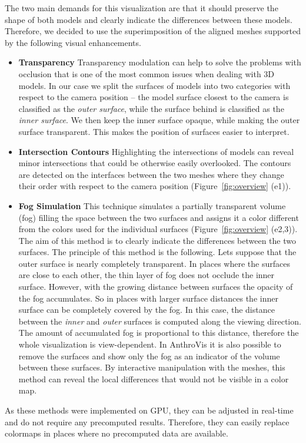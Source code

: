 \documentclass[final,5p,times]{elsarticle}
\begin{document}
The two main demands for this visualization are that it should preserve the shape of both models and clearly indicate the differences between these models.
Therefore, we decided to use the superimposition of the aligned meshes supported by the following visual enhancements.
\begin{itemize}
\item{\textbf{Transparency}} 
Transparency modulation can help to solve the problems with occlusion that is one of the most common issues when dealing with 3D models. 
In our case we split the surfaces of models into two categories with respect to the camera position -- the model surface closest to the camera is classified as the \textit{outer surface}, while the surface behind is classified as the \textit{inner surface}.
We then keep the inner surface opaque, while making the outer surface transparent.
This makes the position of surfaces easier to interpret.
\item{\textbf{Intersection Contours}}
Highlighting the intersections of models can reveal minor intersections that could be otherwise easily overlooked. 
The contours are detected on the interfaces between the two meshes where they change their order with respect to the camera position (Figure~\ref{fig:overview} (e1)). 
\item{\textbf{Fog Simulation}}
This technique simulates a partially transparent volume (fog) filling the space between the two surfaces and assigns it a color different from the colors used for the individual surfaces (Figure~\ref{fig:overview} (e2,3)). 
The aim of this method is to clearly indicate the differences between the two surfaces.
The principle of this method is the following.
Lets suppose that the outer surface is nearly completely transparent.
In places where the surfaces are close to each other, the thin layer of fog does not occlude the inner surface.
However, with the growing distance between surfaces the opacity of the fog accumulates.
So in places with larger surface distances the inner surface can be completely covered by the fog. 
In this case, the distance between the \textit{inner} and \textit{outer} surfaces is computed along the viewing direction.
The amount of accumulated fog is proportional to this distance, therefore the whole visualization is view-dependent.
In AnthroVis it is also possible to remove the surfaces and show only the fog as an indicator of the volume between these surfaces. 
By interactive manipulation with the meshes, this method can reveal the local differences that would not be visible in a color map.
\end{itemize}
As these methods were implemented on GPU, they can be adjusted in real-time and do not require any precomputed results.
Therefore, they can easily replace colormaps in places where no precomputed data are available.
\end{document}
